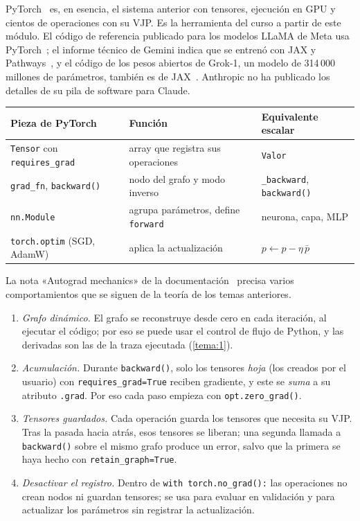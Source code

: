 PyTorch~\cite{paszke} es, en esencia, el sistema anterior con tensores, ejecución en GPU y cientos de operaciones con su VJP. Es la herramienta del curso a partir de este módulo. El código de referencia publicado para los modelos LLaMA de Meta usa PyTorch~\cite{llama}; el informe técnico de Gemini indica que se entrenó con JAX y Pathways~\cite{gemini}, y el código de los pesos abiertos de Grok-1, un modelo de 314\,000 millones de parámetros, también es de JAX~\cite{grok}. Anthropic no ha publicado los detalles de su pila de software para Claude.

\begin{center}\small
\begin{tabular}{@{}lll@{}}
\toprule
Pieza de PyTorch & Función & Equivalente escalar \\
\midrule
\texttt{Tensor} con \texttt{requires\_grad} & array que registra sus operaciones & \texttt{Valor} \\
\texttt{grad\_fn}, \texttt{backward()} & nodo del grafo y modo inverso & \texttt{\_backward}, \texttt{backward()} \\
\texttt{nn.Module} & agrupa parámetros, define \texttt{forward} & neurona, capa, MLP \\
\texttt{torch.optim} (SGD, AdamW) & aplica la actualización & $p\gets p-\eta\,\bar p$ \\
\bottomrule
\end{tabular}
\end{center}

La nota «Autograd mechanics» de la documentación~\cite{pytorch} precisa varios comportamientos que se siguen de la teoría de los temas anteriores.
\begin{enumerate}[label=(\alph*)]
  \item \emph{Grafo dinámico.} El grafo se reconstruye desde cero en cada iteración, al ejecutar el código; por eso se puede usar el control de flujo de Python, y las derivadas son las de la traza ejecutada (\cref{tema:1}).
  \item \emph{Acumulación.} Durante \texttt{backward()}, solo los tensores \emph{hoja} (los creados por el usuario) con \texttt{requires\_grad=True} reciben gradiente, y este se \emph{suma} a su atributo \texttt{.grad}. Por eso cada paso empieza con \texttt{opt.zero\_grad()}.
  \item \emph{Tensores guardados.} Cada operación guarda los tensores que necesita su VJP. Tras la pasada hacia atrás, esos tensores se liberan; una segunda llamada a \texttt{backward()} sobre el mismo grafo produce un error, salvo que la primera se haya hecho con \texttt{retain\_graph=True}.
  \item \emph{Desactivar el registro.} Dentro de \texttt{with torch.no\_grad():} las operaciones no crean nodos ni guardan tensores; se usa para evaluar en validación y para actualizar los parámetros sin registrar la actualización.
\end{enumerate}

